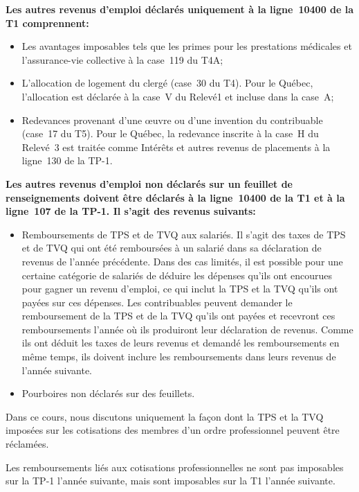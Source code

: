 \textbf{Les autres revenus d'emploi déclarés uniquement à la ligne~10400 de la T1 comprennent:}
\begin{itemize}
	\item Les avantages imposables tels que les primes pour les prestations médicales et l'assurance-vie collective à la case~119 du T4A;
	\item L'allocation de logement du clergé (case~30 du T4). Pour le Québec, l'allocation est déclarée à la case~V du Relevé1 et incluse dans la case~A;
	\item Redevances provenant d'une œuvre ou d'une invention du contribuable (case~17 du T5). Pour le Québec, la redevance inscrite à la case~H du Relevé~3 est traitée comme \og Intérêts et autres revenus de placements\fg{} à la ligne~130 de la TP-1.
\end{itemize}

\textbf{Les autres revenus d'emploi non déclarés sur un feuillet de renseignements doivent être déclarés à la ligne~10400 de la T1 et à la ligne~107 de la TP-1. Il s'agit des revenus suivants:}
\begin{itemize}
	\item Remboursements de TPS et de TVQ aux salariés. Il s'agit des taxes de TPS et de TVQ qui ont été remboursées à un salarié dans sa déclaration de revenus de l'année précédente. Dans des cas limités, il est possible pour une certaine catégorie de salariés de déduire les dépenses qu'ils ont encourues pour gagner un revenu d'emploi, ce qui inclut la TPS et la TVQ qu'ils ont payées sur ces dépenses. Les contribuables peuvent demander le remboursement de la TPS et de la TVQ qu'ils ont payées et recevront ces remboursements l'année où ils produiront leur déclaration de revenus. Comme ils ont déduit les taxes de leurs revenus et demandé les remboursements en même temps, ils doivent inclure les remboursements dans leurs revenus de l'année suivante.
	\item Pourboires non déclarés sur des feuillets.
\end{itemize}
\begin{note}
	Dans ce cours, nous discutons uniquement la façon dont la TPS et la TVQ imposées sur les cotisations des membres d'un ordre professionnel peuvent être réclamées.
	
	Les remboursements liés aux cotisations professionnelles ne sont pas imposables sur la TP-1 l'année suivante, mais sont imposables sur la T1 l'année suivante.
\end{note}

